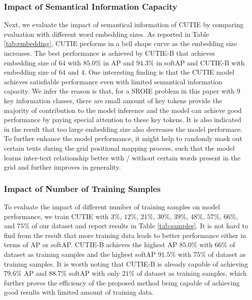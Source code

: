 \documentclass[10pt,twocolumn,letterpaper]{article}
\begin{document}
\subsubsection{Impact of Semantical Information Capacity}
\label{parameters}
Next, we evaluate the impact of semantical information of CUTIE by comparing evaluation with different word embedding sizes. As reported in Table \ref{tab:embedding}, CUTIE performs in a bell shape curve as the embedding size increases. The best performance is achieved by CUTIE-B that achieves embedding size of $64$ with $85.0\%$ in AP and $94.3\%$ in softAP and CUTIE-B with embedding size of $64$ and $4$. One interesting finding is that the CUTIE model achieves satisfiable performance even with limited semantical information capacity. We infer the reason is that, for a SROIE problem in this paper with 9 key information classes, there are small amount of key tokens provide the majority of contribution to the model inference and the model can achieve good performance by paying special attention to these key tokens. It is also indicated in the result that too large embedding size also decreases the model performace. To further enhance the model performance, it might help to randomly mask out certain texts during the grid positional mapping process, such that the model learns inter-text relationship better with / without certain words present in the grid and further improves in generality.

\subsubsection{Impact of Number of Training Samples}
To evaluate the impact of different number of training samples on model performance, we train CUTIE with $3\%$, $12\%$, $21\%$, $30\%$, $39\%$, $48\%$, $57\%$, $66\%$, and $75\%$ of our dataset and report results in Table \ref{tab:samples}. It is not hard to find from the result that more training data leads to better performance either in terms of AP or softAP. CUTIE-B achieves the highest AP $85.0\%$ with $66\%$ of dataset as training samples and the highest softAP $91.5\%$ with $75\%$ of dataset as training samples. It is worth noting that CUTIE-B is already capable of achieving $79.6\%$ AP and $88.7\%$ softAP with only $21\%$ of dataset as training samples, which further proves the efficiency of the proposed method being capable of achieving good results with limited amount of training data.
\end{document}
